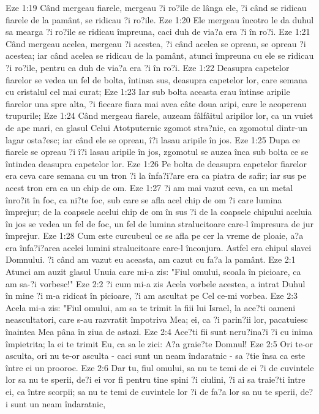 Eze 1:19  Când mergeau fiarele, mergeau ?i ro?ile de lânga ele, ?i când se ridicau fiarele de la pamânt, se ridicau ?i ro?ile.
Eze 1:20  Ele mergeau încotro le da duhul sa mearga ?i ro?ile se ridicau împreuna, caci duh de via?a era ?i în ro?i.
Eze 1:21  Când mergeau acelea, mergeau ?i acestea, ?i când acelea se opreau, se opreau ?i acestea; iar când acelea se ridicau de la pamânt, atunci împreuna cu ele se ridicau ?i ro?ile, pentru ca duh de via?a era ?i în ro?i.
Eze 1:22  Deasupra capetelor fiarelor se vedea un fel de bolta, întinsa sus, deasupra capetelor lor, care semana cu cristalul cel mai curat;
Eze 1:23  Iar sub bolta aceasta erau întinse aripile fiarelor una spre alta, ?i fiecare fiara mai avea câte doua aripi, care le acopereau trupurile;
Eze 1:24  Când mergeau fiarele, auzeam fâlfâitul aripilor lor, ca un vuiet de ape mari, ca glasul Celui Atotputernic zgomot stra?nic, ca zgomotul dintr-un lagar osta?esc; iar când ele se opreau, î?i lasau aripile în jos.
Eze 1:25  Dupa ce fiarele se opreau ?i î?i lasau aripile în jos, zgomotul se auzea înca sub bolta ce se întindea deasupra capetelor lor.
Eze 1:26  Pe bolta de deasupra capetelor fiarelor era ceva care semana cu un tron ?i la înfa?i?are era ca piatra de safir; iar sus pe acest tron era ca un chip de om.
Eze 1:27  ?i am mai vazut ceva, ca un metal înro?it în foc, ca ni?te foc, sub care se afla acel chip de om ?i care lumina împrejur; de la coapsele acelui chip de om în sus ?i de la coapsele chipului aceluia în jos se vedea un fel de foc, un fel de lumina stralucitoare care-l împresura de jur împrejur.
Eze 1:28  Cum este curcubeul ce se afla pe cer la vreme de ploaie, a?a era înfa?i?area acelei lumini stralucitoare care-l înconjura. Astfel era chipul slavei Domnului. ?i când am vazut eu aceasta, am cazut cu fa?a la pamânt.
Eze 2:1  Atunci am auzit glasul Unuia care mi-a zis: "Fiul omului, scoala în picioare, ca am sa-?i vorbesc!"
Eze 2:2  ?i cum mi-a zis Acela vorbele acestea, a intrat Duhul în mine ?i m-a ridicat în picioare, ?i am ascultat pe Cel ce-mi vorbea.
Eze 2:3  Acela mi-a zis: "Fiul omului, am sa te trimit la fiii lui Israel, la ace?ti oameni neascultatori, care s-au razvratit împotriva Mea; ei, ca ?i parin?ii lor, pacatuiesc înaintea Mea pâna în ziua de astazi.
Eze 2:4  Ace?ti fii sunt neru?ina?i ?i cu inima împietrita; la ei te trimit Eu, ca sa le zici: A?a graie?te Domnul!
Eze 2:5  Ori te-or asculta, ori nu te-or asculta - caci sunt un neam îndaratnic - sa ?tie însa ca este între ei un prooroc.
Eze 2:6  Dar tu, fiul omului, sa nu te temi de ei ?i de cuvintele lor sa nu te sperii, de?i ei vor fi pentru tine spini ?i ciulini, ?i ai sa traie?ti între ei, ca între scorpii; sa nu te temi de cuvintele lor ?i de fa?a lor sa nu te sperii, de?i sunt un neam îndaratnic,
